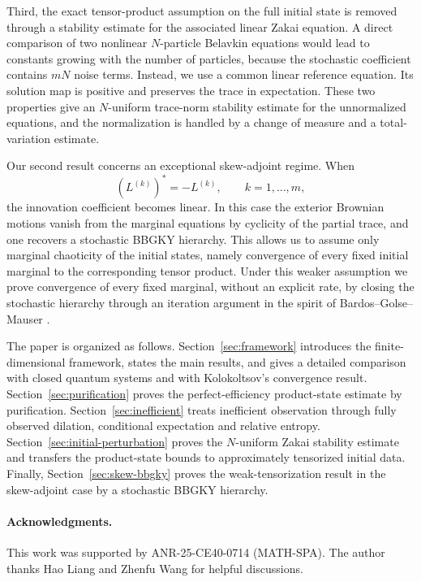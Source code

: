 \documentclass[10pt,a4paper,reqno]{amsart}
\numberwithin{equation}{section}
\theoremstyle{plain}
\theoremstyle{definition}
\theoremstyle{remark}
\newcommand{\1}{\mathbf 1}
\begin{document}
Third, the exact tensor-product assumption on the full initial state is removed
through a stability estimate for the associated linear Zakai equation.  A
direct comparison of two nonlinear \(N\)-particle Belavkin equations would
lead to constants growing with the number of particles, because the stochastic
coefficient contains \(mN\) noise terms.  Instead, we use a common linear
reference equation.  Its solution map is positive and preserves the trace in
expectation.  These two properties give an \(N\)-uniform trace-norm stability
estimate for the unnormalized equations, and the normalization is handled by a
change of measure and a total-variation estimate.

Our second result concerns an exceptional skew-adjoint regime.  When
\[
  (L^{(k)})^*=-L^{(k)},
  \qquad k=1,\ldots,m,
\]
the innovation coefficient becomes linear.  In this case the exterior Brownian
motions vanish from the marginal equations by cyclicity of the partial trace,
and one recovers a stochastic BBGKY hierarchy.  This allows us to assume only
marginal chaoticity of the initial states, namely convergence of every fixed
initial marginal to the corresponding tensor product.  Under this weaker
assumption we prove convergence of every fixed marginal, without an explicit
rate, by closing the stochastic hierarchy through an iteration argument in the
spirit of Bardos--Golse--Mauser \cite{bardos2000}.

The paper is organized as follows.  Section~\ref{sec:framework} introduces the
finite-dimensional framework, states the main results, and gives a detailed
comparison with closed quantum systems and with Kolokoltsov's convergence
result.  Section~\ref{sec:purification} proves the perfect-efficiency
product-state estimate by purification.  Section~\ref{sec:inefficient} treats
inefficient observation through fully observed dilation, conditional
expectation and relative entropy.  Section~\ref{sec:initial-perturbation}
proves the \(N\)-uniform Zakai stability estimate and transfers the
product-state bounds to approximately tensorized initial data.  Finally,
Section~\ref{sec:skew-bbgky} proves the weak-tensorization result in the
skew-adjoint case by a stochastic BBGKY hierarchy.







\bigskip



\paragraph{\bf Acknowledgments.} This work was supported by ANR-25-CE40-0714 (MATH-SPA).  The author thanks Hao Liang and Zhenfu Wang for helpful discussions.  
\end{document}
